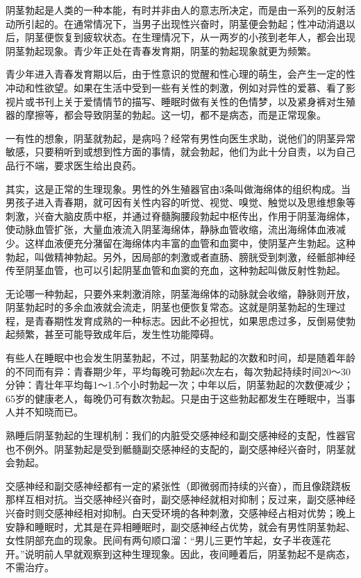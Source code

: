 阴茎勃起是人类的一种本能，有时并非由人的意志所决定，而是由一系列的反射活动所引起的。在通常情况下，当男子出现性兴奋时，阴茎便会勃起；性冲动消退以后，阴茎便恢复到疲软状态。在生理情况下，从一两岁的小孩到老年人，都会出现阴茎勃起现象。青少年正处在青春发育期，阴茎的勃起现象就更为频繁。

青少年进入青春发育期以后，由于性意识的觉醒和性心理的萌生，会产生一定的性冲动和性欲望。如果在生活中受到一些有关性的刺激，例如对异性的爱慕、看了影视片或书刊上关于爱情情节的描写、睡眠时做有关性的色情梦，以及紧身裤对生殖器的摩擦等，都会导致阴茎的勃起。这一切，都不是病态，而是正常现象。

一有性的想象，阴茎就勃起，是病吗？经常有男性向医生求助，说他们的阴茎异常敏感，只要稍听到或想到性方面的事情，就会勃起，他们为此十分自责，以为自己品行不端，要求医生给出良药。

其实，这是正常的生理现象。男性的外生殖器官由3条叫做海绵体的组织构成。当男孩子进入青春期，就可因有关性内容的听觉、视觉、嗅觉、触觉以及思维想象等刺激，兴奋大脑皮质中枢，并通过脊髓胸腰段勃起中枢传出，作用于阴茎海绵体，使动脉血管扩张，大量血液流入阴茎海绵体，静脉血管收缩，流出海绵体血液减少。这样血液便充分潴留在海绵体内丰富的血管和血窦中，使阴茎产生勃起。这种勃起，叫做精神勃起。另外，因局部的刺激或者直肠、膀胱受到刺激，经骶部神经传至阴茎血管，也可以引起阴茎血管和血窦的充血，这种勃起叫做反射性勃起。

无论哪一种勃起，只要外来刺激消除，阴茎海绵体的动脉就会收缩，静脉则开放，阴茎勃起时的多余血液就会流走，阴茎也便恢复常态。这就是阴茎勃起的生理过程，是青春期性发育成熟的一种标志。因此不必担忧，如果思虑过多，反倒易使勃起频繁，甚至可能导致成年后，发生性功能障碍。

有些人在睡眠中也会发生阴茎勃起，不过，阴茎勃起的次数和时间，却是随着年龄的不同而有异：青春期少年，平均每晚可勃起6次左右，每次勃起持续时间20～30分钟：青壮年平均每1～1.5个小时勃起一次；中年以后，阴茎勃起的次数便减少；65岁的健康老人，每晚仍可有数次勃起。只是由于这些勃起都发生在睡眠中，当事人并不知晓而已。

熟睡后阴茎勃起的生理机制：我们的内脏受交感神经和副交感神经的支配，性器官也不例外。阴茎勃起是受到骶髓副交感神经的支配的，副交感神经兴奋时，阴茎就会勃起。

交感神经和副交感神经都有一定的紧张性（即微弱而持续的兴奋），而且像跷跷板那样互相对抗。当交感神经兴奋时，副交感神经就相对抑制；反过来，副交感神经兴奋时则交感神经相对抑制。白天受环境的各种刺激，交感神经占相对优势；晚上安静和睡眠时，尤其是在异相睡眠时，副交感神经占优势，就会有男性阴茎勃起、女性阴部充血的现象。民间有两句顺口溜：“男儿三更竹竿起，女子半夜莲花开。”说明前人早就观察到这种生理现象。因此，夜间睡着后，阴茎勃起不是病态，不需治疗。

